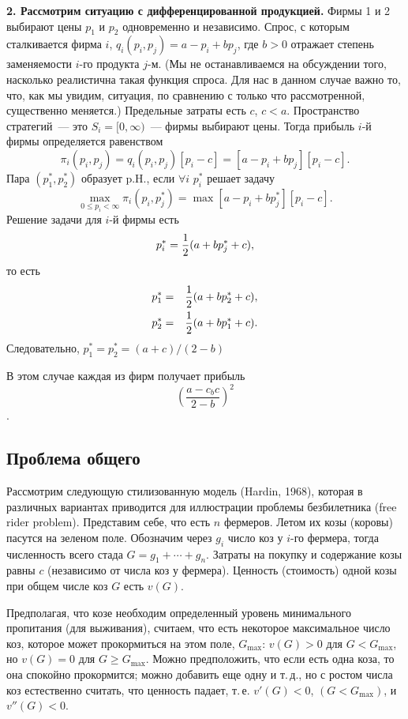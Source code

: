 {{\bf 2. Рассмотрим ситуацию с дифференцированной продукцией.} Фирмы
1 и  2 выбирают цены $p_1$ и $p_2$ одновременно и независимо. Спрос,
с которым сталкивается фирма $i$, $q_i(p_i,p_j)=a-p_i+bp_j$, где
$b>0$ отражает степень заменяемости $i$-го продукта $j$-м.  (Мы не
останавливаемся на обсуждении того, насколько реалистична такая
функция спроса. Для нас в данном случае важно то, что, как мы увидим,
ситуация, по сравнению с только что рассмотренной, существенно
меняется.) Предельные
затраты  есть $c$, $c<a$. Пространство стратегий~--- это
$S_i=[0,\infty)$~---  фирмы выбирают цены.  Тогда прибыль  $i$-й
фирмы определяется равенством
$$
\pi_i(p_i,p_j)=q_i(p_i,p_j)[p_i-c]=[a-p_i+bp_j][p_i-c].
$$
Пара $(p^*_1,p^*_2)$ образует p.H., если $\forall i$ $p^*_i$ решает
задачу
$$
\max_{0\le p_i<\infty}\pi_i(p_i,p^*_j)=\max[a-p_i+bp^*_j][p_i-c].
$$
Решение задачи для $i$-й фирмы есть
$$
p^*_i={1\over 2}(a+bp^*_j+c),
$$
то есть
\begin{eqnarray}
p^*_1&=&{1\over 2}(a+bp^*_2+c),\nonumber\\
p^*_2&=&{1\over 2}(a+bp^*_1+c).\nonumber
\end{eqnarray}
Следовательно, $p^*_1=p^*_2=(a+c)/(2-b)$
\smallskip

В этом случае каждая из фирм получает прибыль
$$(\frac{a-c_bc}{2-b})^2$$.

\subsection{Проблема общего}

Рассмотрим следующую стилизованную модель (Hardin, 1968), которая
в различных вариантах приводится для иллюстрации проблемы безбилетника
(free rider problem).
Представим себе, что есть $n$ фермеров. Летом их козы (коровы)
пасутся на зеленом поле. Обозначим через $g_i$ число коз у $i$-го
фермера, тогда численность всего стада $G=g_1+\cdots+g_n$.  Затраты
на покупку и содержание козы равны $c$ (независимо от числа коз у
фермера). Ценность (стоимость) одной козы при общем числе коз $G$
есть $v(G)$.

Предполагая, что козе необходим определенный уровень минимального
пропитания (для выживания), считаем, что есть некоторое максимальное
число коз, которое может прокормиться на этом поле,  $G_{\max}$: $v(G)>0$ для
$G<G_{\max}$, но $v(G)=0$ для $G\ge G_{\max}$. Можно предположить,
что если есть одна коза, то  она спокойно прокормится; можно
добавить еще одну и т.\,д., но с ростом числа коз естественно
считать, что ценность падает, т.\,е. $v'(G)<0$, $(G<G_{\max})$,  и
$v''(G)<0$.

}
